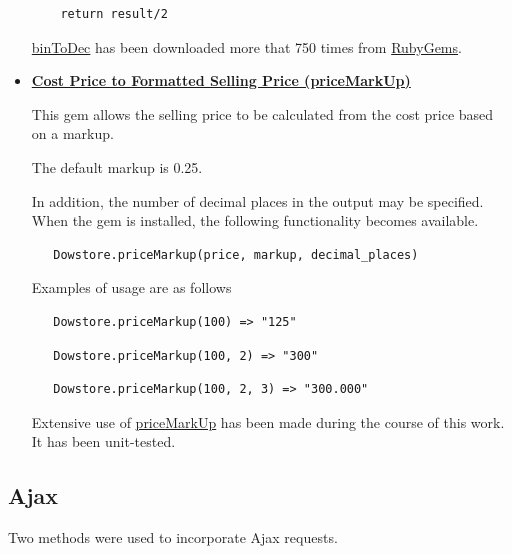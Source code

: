 \documentclass[11pt]{article}
\begin{document}
\begin{itemize}[itemsep=1ex,leftmargin=1cm,rightmargin=1cm]
\begin{verbatim}
    return result/2
\end{verbatim}
\href{https://rubygems.org/gems/binToDec}{binToDec} has been downloaded more that 750 times from \href{https://rubygems.org/}{RubyGems}.    
\item[] \textbf{\href{https://rubygems.org/gems/priceMarkup}{Cost Price to Formatted Selling Price (priceMarkUp)}}

This gem allows the selling price to be calculated from the cost price based on a markup. 

The default markup is 0.25. 

In addition, the number of decimal places in the output may be specified. 
When the gem is installed, the following functionality becomes available.
\begin{verbatim}
   Dowstore.priceMarkup(price, markup, decimal_places)
\end{verbatim}

Examples of usage are as follows
\begin{verbatim}
   Dowstore.priceMarkup(100) => "125"
\end{verbatim}

\begin{verbatim}
   Dowstore.priceMarkup(100, 2) => "300"
\end{verbatim}
\begin{verbatim}
   Dowstore.priceMarkup(100, 2, 3) => "300.000"
\end{verbatim}
Extensive use of \href{https://rubygems.org/gems/priceMarkup}{priceMarkUp} 
has been made during the course of this work. It has been unit-tested.
\end{itemize} 

\hypertarget{label:sectajax}{ \subsection{Ajax}\label{label:ajax}}
Two methods were used to incorporate Ajax requests.
\end{document}
